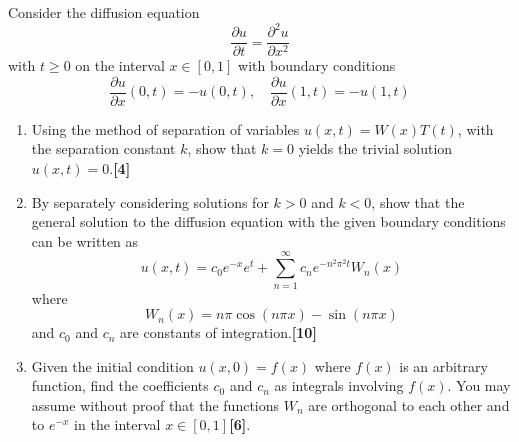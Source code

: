 \documentclass[a4paper]{article}
\begin{document}
\begin{qns}\leavevmode
Consider the diffusion equation
$$\frac{\partial u}{\partial t}=\frac{\partial^2u}{\partial x^2}$$
with $t\geq0$ on the interval $x\in[0,1]$ with boundary conditions
$$\frac{\partial u}{\partial x}(0,t)=-u(0,t),\quad \frac{\partial u}{\partial x}(1,t)=-u(1,t)$$
\begin{enumerate}[label=(\roman*)]
\item Using the method of separation of variables $u(x, t) = W(x)T(t)$, with the separation constant $k$, show that $k = 0$ yields the trivial solution $u(x, t) = 0$.\hfill\textbf{[4]}
\item By separately considering solutions for $k > 0$ and $k < 0$, show that the general solution to the diffusion equation with the given boundary conditions can be written as
$$u(x,t)=c_0e^{-x}e^t+\sum_{n=1}^\infty c_ne^{-n^2\pi^2t}W_n(x)$$
where 
$$W_n(x) = n\pi \cos(n\pi x) − \sin(n\pi x)$$
and $c_0$ and $c_n$ are constants of integration.\hfill\textbf{[10]}
\item Given the initial condition $u(x, 0) = f(x)$ where $f(x)$ is an arbitrary function, find the coefficients $c_0$ and $c_n$ as integrals involving $f(x)$. You may assume without proof that the functions $W_n$ are orthogonal to each other and to $e^{-x}$ in the interval $x\in[0,1]$\hfill\textbf{[6]}.
\end{enumerate}
\end{qns}
\end{document}
